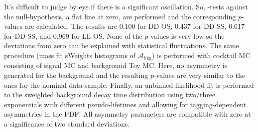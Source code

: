 %
It's difficult to judge by eye if there is a significant oscillation. So,
\chisq-tests against the null-hypothesis, \ie a flat line at zero, are
performed and the corresponding $p$-values are calculated. The results are
\num{0.100} for DD OS, \num{0.437} for DD SS, \num{0.617} for DD SS, and
\num{0.969} for LL OS. None of the $p$-values is very low so the deviations
from zero can be explained with statistical fluctuations. The same procedure
(mass fit \to sWeights \to histograms of $\mathcal{A}_{\text{bkg}}$) is
performed with cocktail MC consisting of signal MC and background Toy MC.
Here, no asymmetry is generated for the background and the resulting
$p$-values are very similar to the ones for the nominal data sample. Finally,
an unbinned likelihood fit is performed to the sweighted background decay time
distribution using two/three exponentials with different pseudo-lifetimes and
allowing for tagging-dependent asymmetries in the PDF. All asymmetry
parameters are compatible with zero at a significance of two standard
deviations.